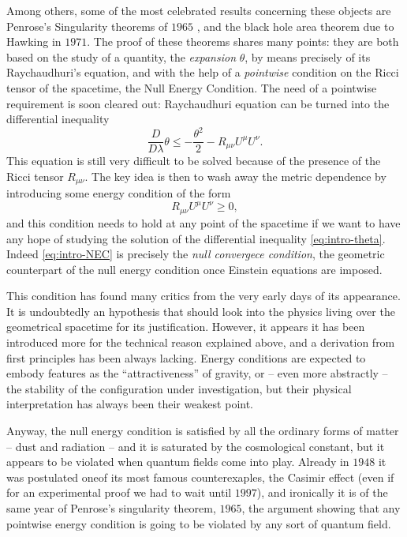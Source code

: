 Among others, some of the most celebrated results concerning these objects are Penrose's Singularity theorems of \(1965\) \cite[]{penrose1965gravitational}, and the black hole area theorem due to Hawking \cite[]{hawking1972black} in \(1971\). The proof of these theorems shares many points: they are both based on the study of a quantity, the \emph{expansion} \(\theta\), by means precisely of its Raychaudhuri's equation, and with the help of a \emph{pointwise} condition on the Ricci tensor of the spacetime, the Null Energy Condition. The need of a pointwise requirement is soon cleared out: Raychaudhuri equation can be turned into the differential inequality
\begin{equation}
    \label{eq:intro-theta}
    \frac{D}{D\lambda}\theta \le -\frac{\theta^2}{2} - R_{\mu\nu}U^{\mu}U^{\nu}.
\end{equation}
This equation is still very difficult to be solved because of the presence of the Ricci tensor \(R_{\mu\nu}\). The key idea is then to wash away the metric dependence by introducing some energy condition of the form 
\begin{equation}
    \label{eq:intro-NEC}
    R_{\mu\nu}U^{\mu}U^{\nu}\ge 0,
\end{equation}
and this condition needs to hold at any point of the spacetime if we want to have any hope of studying the solution of the differential inequality \eqref{eq:intro-theta}. Indeed \eqref{eq:intro-NEC} is precisely the \emph{null convergece condition}, the geometric counterpart of the null energy condition once Einstein equations are imposed.

This condition has found many critics from the very early days of its appearance. It is undoubtedly an hypothesis that should look into the physics living over the geometrical spacetime for its justification. However, it appears it has been introduced more for the technical reason explained above, and a derivation from first principles has been always lacking. Energy conditions are expected to embody features as the ``attractiveness'' of gravity, or -- even more abstractly -- the stability of the configuration under investigation, but their physical interpretation has always been their weakest point.

Anyway, the null energy condition is satisfied by all the ordinary forms of matter -- dust and radiation -- and it is saturated by the cosmological constant, but it appears to be violated when quantum fields come into play.
Already in \(1948\) it was postulated oneof its most famous counterexaples, the Casimir effect (even if for an experimental proof we had to wait until \(1997\)), and ironically it is of the same year of Penrose's singularity theorem, \(1965\), the argument showing that any pointwise energy condition is going to be violated by any sort of quantum field.

